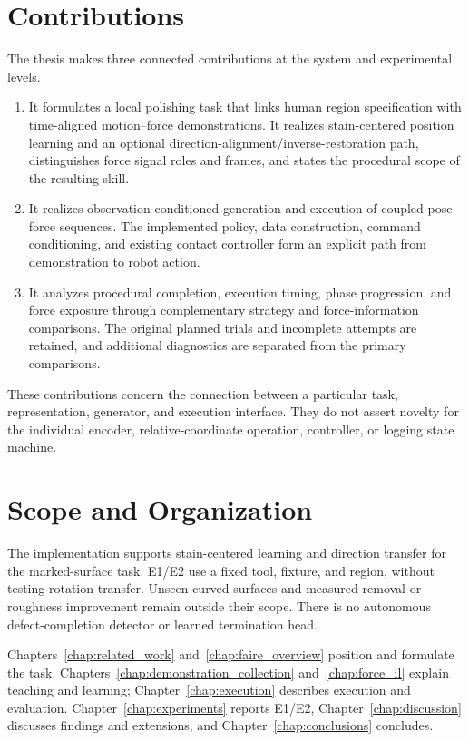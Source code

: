 \section{Contributions}
The thesis makes three connected contributions at the system and experimental levels.
\begin{enumerate}[leftmargin=0.8cm]
\item It formulates a local polishing task that links human region specification with time-aligned motion--force demonstrations. It realizes stain-centered position learning and an optional direction-alignment/inverse-restoration path, distinguishes force signal roles and frames, and states the procedural scope of the resulting skill.
\item It realizes observation-conditioned generation and execution of coupled pose--force sequences. The implemented policy, data construction, command conditioning, and existing contact controller form an explicit path from demonstration to robot action.
\item It analyzes procedural completion, execution timing, phase progression, and force exposure through complementary strategy and force-information comparisons. The original planned trials and incomplete attempts are retained, and additional diagnostics are separated from the primary comparisons.
\end{enumerate}
These contributions concern the connection between a particular task, representation, generator, and execution interface. They do not assert novelty for the individual encoder, relative-coordinate operation, controller, or logging state machine.

\section{Scope and Organization}
The implementation supports stain-centered learning and direction transfer for the marked-surface task. E1/E2 use a fixed tool, fixture, and region, without testing rotation transfer. Unseen curved surfaces and measured removal or roughness improvement remain outside their scope. There is no autonomous defect-completion detector or learned termination head.

Chapters~\ref{chap:related_work} and~\ref{chap:faire_overview} position and formulate the task. Chapters~\ref{chap:demonstration_collection} and~\ref{chap:force_il} explain teaching and learning; Chapter~\ref{chap:execution} describes execution and evaluation. Chapter~\ref{chap:experiments} reports E1/E2, Chapter~\ref{chap:discussion} discusses findings and extensions, and Chapter~\ref{chap:conclusions} concludes.
